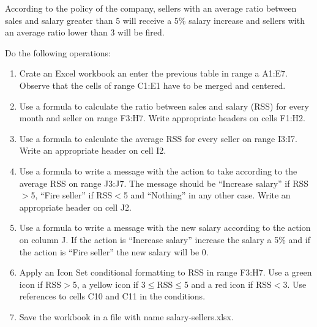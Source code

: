 \begin{enumerate}[leftmargin=*,resume]
According to the policy of the company, sellers with an average ratio between sales and salary greater than 5 will
receive a 5\% salary increase and sellers with an average ratio lower than 3 will be fired. 

Do the following operations:
\begin{enumerate}
\item Crate an Excel workbook an enter the previous table in range a A1:E7. Observe that the cells of range C1:E1 have
to be merged and centered. 
\item Use a formula to calculate the ratio between sales and salary (RSS) for every month and seller on range F3:H7.
Write appropriate headers on cells F1:H2.  
\item Use a formula to calculate the average RSS for every seller on range I3:I7.
Write an appropriate header on cell I2. 
\item Use a formula to write a message with the action to take according to the average RSS on range J3:J7.
The message should be ``Increase salary'' if RSS$>$5, ``Fire seller'' if RSS$<$5 and ``Nothing'' in any other case.
Write an appropriate header on cell J2. 
\item Use a formula to write a message with the new salary according to the action on column J.
If the action is ``Increase salary'' increase the salary a 5\% and if the action is ``Fire seller'' the new salary will
be 0. 
\item Apply an Icon Set conditional formatting to RSS in range F3:H7. Use a green icon if RSS$>$5, a yellow icon if
3$\leq$RSS$\leq$5 and a red icon if RSS$<3$. Use references to cells C10 and C11 in the conditions. 
\item Save the workbook in a file with name \textsf{salary-sellers.xlsx}. 
\end{enumerate}


\end{enumerate}

